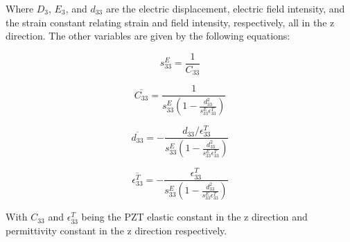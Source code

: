 Where $D_3$, $E_3$, and $d_{33}$ are the electric displacement, electric field intensity, and the strain constant relating strain and field intensity, respectively, all in the z direction. The other variables are given by the following equations:

\begin{equation}
s^E_{33} = \frac{1}{C_{33}}
\end{equation}

\begin{equation}
\overline{C_{33}} = \frac{1}{s^E_{33}(1 - \frac{d^2_{33}}{s^E_{33}\epsilon ^T_{33}})}
\end{equation}

\begin{equation}
\overline{d_{33}} = -\frac{d_{33} / \epsilon ^T_{33}}{s^E_{33}(1 - \frac{d^2_{33}}{s^E_{33}\epsilon ^T_{33}})}
\end{equation}

\begin{equation}
\overline{\epsilon ^T_{33}} = -\frac{\epsilon ^T_{33}}{s^E_{33}(1 - \frac{d^2_{33}}{s^E_{33}\epsilon ^T_{33}})}
\end{equation}

With $C_{33}$ and $\epsilon ^T_{33}$ being the PZT elastic constant in the z direction and permittivity constant in the z direction respectively.